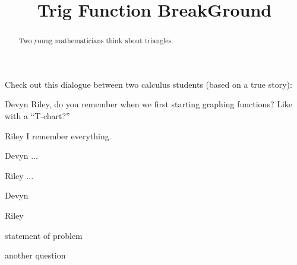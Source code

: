 \documentclass{ximera}
\title[Break-Ground:]{Trig Function BreakGround}
\begin{document}
\begin{abstract}
  Two young mathematicians think about triangles.
\end{abstract}
\maketitle

Check out this dialogue between two calculus students (based on a true
story):

\begin{dialogue}
\item[Devyn] Riley, do you remember when we first starting graphing
  functions? Like with a ``T-chart?''
\item[Riley] I remember everything.
\item[Devyn] ...
\item[Riley] ...
\item[Devyn] 
\item[Riley] 
\end{dialogue}

\begin{problem}
  statement of problem
   \begin{multipleChoice}
  \end{multipleChoice}
\end{problem}



\begin{problem}
   another question
    \begin{multipleChoice}
  \end{multipleChoice}
\end{problem}




\end{document}
